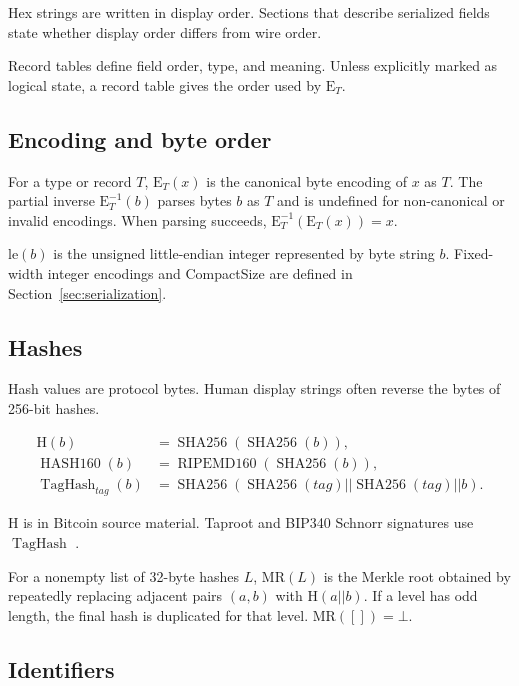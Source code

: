 Hex strings are written in display order. Sections that describe serialized
fields state whether display order differs from wire order.

Record tables define field order, type, and meaning. Unless explicitly marked
as logical state, a record table gives the order used by \(\mathrm{E}_{T}\).

\subsection{Encoding and byte order}

For a type or record \(T\), \(\mathrm{E}_{T}(x)\) is the canonical byte
encoding of \(x\) as \(T\). The partial inverse
\(\mathrm{E}_{T}^{-1}(b)\) parses bytes \(b\) as \(T\) and is undefined for
non-canonical or invalid encodings. When parsing succeeds,
\(\mathrm{E}_{T}^{-1}(\mathrm{E}_{T}(x))=x\).

\(\mathrm{le}(b)\) is the unsigned little-endian integer represented by byte
string \(b\). Fixed-width integer encodings and CompactSize are defined in
Section~\ref{sec:serialization}.

\subsection{Hashes}

Hash values are protocol bytes. Human display strings often reverse the bytes
of 256-bit hashes.

\[
\begin{aligned}
  \mathrm{H}(b) &= \operatorname{SHA256}(\operatorname{SHA256}(b)),\\
  \operatorname{HASH160}(b) &= \operatorname{RIPEMD160}(\operatorname{SHA256}(b)),\\
  \operatorname{TagHash}_{tag}(b)
    &= \operatorname{SHA256}(\operatorname{SHA256}(tag) ||
       \operatorname{SHA256}(tag) || b).
\end{aligned}
\]

\(\mathrm{H}\) is  in Bitcoin source material. Taproot and
BIP340 Schnorr signatures use \(\operatorname{TagHash}\)
\cite{nakamoto-bitcoin,bip-0340,bip-0341}.

For a nonempty list of 32-byte hashes \(L\), \(\mathrm{MR}(L)\) is the Merkle
root obtained by repeatedly replacing adjacent pairs \((a,b)\) with
\(\mathrm{H}(a||b)\). If a level has odd length, the final hash is duplicated
for that level. \(\mathrm{MR}([])=\bot\).

\subsection{Identifiers}

